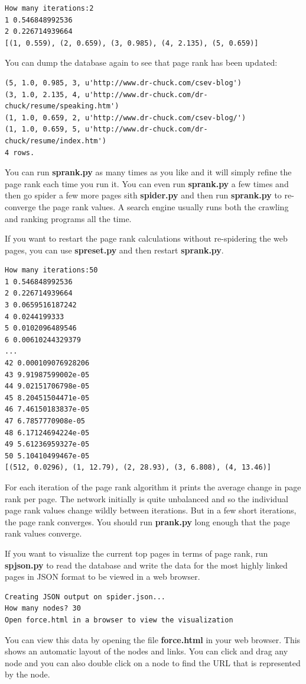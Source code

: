 \documentclass[11pt]{book}
\begin{document}
\beforeverb
\begin{verbatim}
How many iterations:2
1 0.546848992536
2 0.226714939664
[(1, 0.559), (2, 0.659), (3, 0.985), (4, 2.135), (5, 0.659)]
\end{verbatim}
\afterverb
%
You can dump the database again to see that page rank has been updated:

\beforeverb
\begin{verbatim}
(5, 1.0, 0.985, 3, u'http://www.dr-chuck.com/csev-blog')
(3, 1.0, 2.135, 4, u'http://www.dr-chuck.com/dr-chuck/resume/speaking.htm')
(1, 1.0, 0.659, 2, u'http://www.dr-chuck.com/csev-blog/')
(1, 1.0, 0.659, 5, u'http://www.dr-chuck.com/dr-chuck/resume/index.htm')
4 rows.
\end{verbatim}
\afterverb
%
You can run {\bf sprank.py} as many times as you like and it will simply refine
the page rank each time you run it.  You can even run {\bf sprank.py} a few times
and then go spider a few more pages sith {\bf spider.py} and then run {\bf sprank.py}
to re-converge the page rank values.  A search engine usually runs both the crawling and 
ranking programs all the time.

If you want to restart the page rank calculations without re-spidering the 
web pages, you can use {\bf spreset.py} and then restart {\bf sprank.py}.

\beforeverb
\begin{verbatim}
How many iterations:50
1 0.546848992536
2 0.226714939664
3 0.0659516187242
4 0.0244199333
5 0.0102096489546
6 0.00610244329379
...
42 0.000109076928206
43 9.91987599002e-05
44 9.02151706798e-05
45 8.20451504471e-05
46 7.46150183837e-05
47 6.7857770908e-05
48 6.17124694224e-05
49 5.61236959327e-05
50 5.10410499467e-05
[(512, 0.0296), (1, 12.79), (2, 28.93), (3, 6.808), (4, 13.46)]
\end{verbatim}
\afterverb
%
For each iteration of the page rank algorithm it prints the average
change in page rank per page.   The network initially is quite
unbalanced and so the individual page rank values change wildly between
iterations.
But in a few short iterations, the page rank converges.  You
should run {\bf prank.py} long enough that the page rank values converge.

If you want to visualize the current top pages in terms of page rank,
run {\bf spjson.py} to read the database and write the data for the 
most highly linked pages in JSON format to be viewed in a
web browser.

\beforeverb
\begin{verbatim}
Creating JSON output on spider.json...
How many nodes? 30
Open force.html in a browser to view the visualization
\end{verbatim}
\afterverb
%
You can view this data by opening the file {\bf force.html} in your web browser.  
This shows an automatic layout of the nodes and links.  You can click and 
drag any node and you can also double click on a node to find the URL
that is represented by the node.
\end{document}
